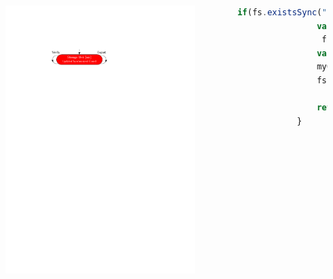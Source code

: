 \documentclass{beamer}
\begin{document}
\begin{frame}[fragile]
\begin{columns}
\begin{figure}
			\includegraphics[width=\textwidth]{figures/usc.pdf}
			\bigskip
		\end{figure}
		\begin{lstlisting}[language=JavaScript, numbers=none]
			if(fs.existsSync(".pinesu.json")){
				var data = 
				 fs.readFileSync(".pinesu.json")
				var myObj = JSON.parse(data);
				myObj.closed = true;
				fs.writeFileSync(".pinesu.json",
					JSON.stringify(myObj));
				return myObj;
			}
		\end{lstlisting}
	\end{columns}
\end{frame}
\end{document}
